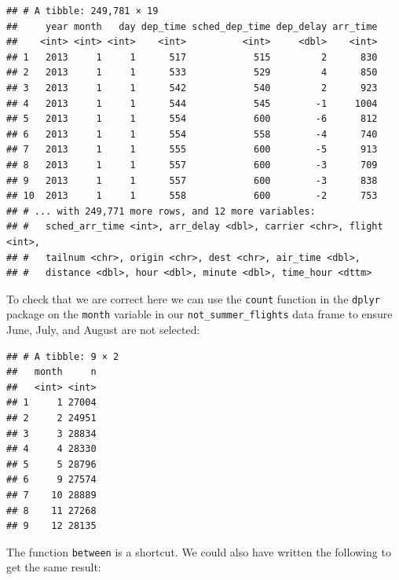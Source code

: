 \documentclass[]{tufte-book}
\newenvironment{Shaded}{\begin{snugshade}}{\end{snugshade}}
\newcommand{\KeywordTok}[1]{\textcolor[rgb]{0.13,0.29,0.53}{\textbf{{#1}}}}
\newcommand{\DecValTok}[1]{\textcolor[rgb]{0.00,0.00,0.81}{{#1}}}
\newcommand{\StringTok}[1]{\textcolor[rgb]{0.31,0.60,0.02}{{#1}}}
\newcommand{\NormalTok}[1]{{#1}}
\begin{document}
\begin{verbatim}
## # A tibble: 249,781 × 19
##     year month   day dep_time sched_dep_time dep_delay arr_time
##    <int> <int> <int>    <int>          <int>     <dbl>    <int>
## 1   2013     1     1      517            515         2      830
## 2   2013     1     1      533            529         4      850
## 3   2013     1     1      542            540         2      923
## 4   2013     1     1      544            545        -1     1004
## 5   2013     1     1      554            600        -6      812
## 6   2013     1     1      554            558        -4      740
## 7   2013     1     1      555            600        -5      913
## 8   2013     1     1      557            600        -3      709
## 9   2013     1     1      557            600        -3      838
## 10  2013     1     1      558            600        -2      753
## # ... with 249,771 more rows, and 12 more variables:
## #   sched_arr_time <int>, arr_delay <dbl>, carrier <chr>, flight <int>,
## #   tailnum <chr>, origin <chr>, dest <chr>, air_time <dbl>,
## #   distance <dbl>, hour <dbl>, minute <dbl>, time_hour <dttm>
\end{verbatim}

To check that we are correct here we can use the \texttt{count} function
in the \texttt{dplyr} package on the \texttt{month} variable in our
\texttt{not\_summer\_flights} data frame to ensure June, July, and
August are not selected:

\begin{Shaded}
\end{Shaded}

\begin{verbatim}
## # A tibble: 9 × 2
##   month     n
##   <int> <int>
## 1     1 27004
## 2     2 24951
## 3     3 28834
## 4     4 28330
## 5     5 28796
## 6     9 27574
## 7    10 28889
## 8    11 27268
## 9    12 28135
\end{verbatim}

The function \texttt{between} is a shortcut. We could also have written
the following to get the same result:

\begin{Shaded}
\end{Shaded}
\end{document}
